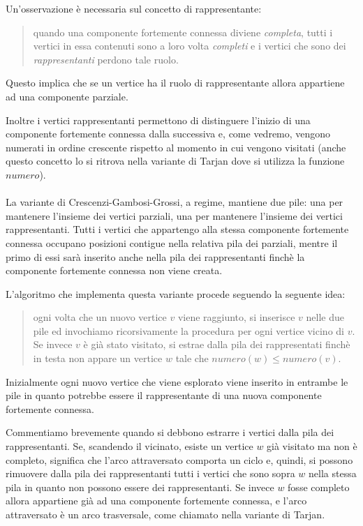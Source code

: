 Un'osservazione \`e necessaria sul concetto di rappresentante:
\begin{quotation}
  quando una componente fortemente connessa diviene \emph{completa},
  tutti i vertici in essa contenuti sono a loro volta \emph{completi}
  e i vertici che sono dei \emph{rappresentanti} perdono tale ruolo.
\end{quotation}
Questo implica che se un vertice ha il ruolo di rappresentante allora
appartiene ad una componente parziale.

Inoltre i vertici rappresentanti permettono di distinguere l'inizio di
una componente fortemente connessa dalla successiva e, come vedremo,
vengono numerati in ordine crescente rispetto al momento in cui
vengono visitati (anche questo concetto lo si ritrova nella variante
di Tarjan dove si utilizza la funzione $numero$).
\\\\
La variante di Crescenzi-Gambosi-Grossi, a regime, mantiene due pile:
una per mantenere l'insieme dei vertici parziali, una per mantenere
l'insieme dei vertici rappresentanti. Tutti i vertici che appartengo
alla stessa componente fortemente connessa occupano posizioni contigue
nella relativa pila dei parziali, mentre il primo di essi sar\`a
inserito anche nella pila dei rappresentanti finch\`e la componente
fortemente connessa non viene creata.

L'algoritmo che implementa questa variante procede seguendo la
seguente idea:
\begin{quotation}
  ogni volta che un nuovo vertice $v$ viene raggiunto, si inserisce
  $v$ nelle due pile ed invochiamo ricorsivamente la procedura per
  ogni vertice vicino di $v$. Se invece $v$ \`e gi\`a stato visitato,
  si estrae dalla pila dei rappresentati finch\`e in testa non appare
  un vertice $w$ tale che $numero(w) \leq numero(v)$.
\end{quotation}
Inizialmente ogni nuovo vertice che viene esplorato viene inserito in
entrambe le pile in quanto potrebbe essere il rappresentante di una
nuova componente fortemente connessa.

Commentiamo brevemente quando si debbono estrarre i vertici dalla pila
dei rappresentanti. Se, scandendo il vicinato, esiste un vertice $w$
gi\`a visitato ma non \`e completo, significa che l'arco attraversato
comporta un ciclo e, quindi, si possono rimuovere dalla pila dei
rappresentanti tutti i vertici che sono sopra $w$ nella stessa pila in
quanto non possono essere dei rappresentanti. Se invece $w$ fosse
completo allora appartiene gi\`a ad una componente fortemente
connessa, e l'arco attraversato \`e un arco trasversale, come chiamato
nella variante di Tarjan.

